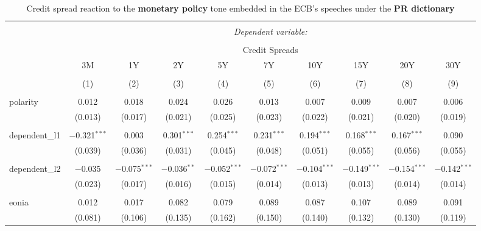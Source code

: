 
\begin{table}[!htbp] \centering 
  \caption[PR Monetary Policy Tone \& Credit Spread: all speeches]{Credit spread reaction to the \textbf{monetary policy} tone embedded in the ECB's speeches under the \textbf{PR dictionary}} 
  \label{tab:spreads_all_pr_mp} 
  \begin{adjustbox}{width=1.25\textwidth}
\begin{tabular}{@{\extracolsep{5pt}}lccccccccc} 
\\[-1.8ex]\hline 
\hline \\[-1.8ex] 
 & \multicolumn{9}{c}{\textit{Dependent variable:}} \\ 
\cline{2-10} 
\\[-1.8ex] & \multicolumn{9}{c}{Credit Spreads} \\ 
 & 3M & 1Y & 2Y & 5Y & 7Y & 10Y & 15Y & 20Y & 30Y \\ 
\\[-1.8ex] & (1) & (2) & (3) & (4) & (5) & (6) & (7) & (8) & (9)\\ 
\hline \\[-1.8ex] 
 polarity & 0.012 & 0.018 & 0.024 & 0.026 & 0.013 & 0.007 & 0.009 & 0.007 & 0.006 \\ 
  & (0.013) & (0.017) & (0.021) & (0.025) & (0.023) & (0.022) & (0.021) & (0.020) & (0.019) \\ 
  & & & & & & & & & \\ 
 dependent\_l1 & $-$0.321$^{***}$ & 0.003 & 0.301$^{***}$ & 0.254$^{***}$ & 0.231$^{***}$ & 0.194$^{***}$ & 0.168$^{***}$ & 0.167$^{***}$ & 0.090 \\ 
  & (0.039) & (0.036) & (0.031) & (0.045) & (0.048) & (0.051) & (0.055) & (0.056) & (0.055) \\ 
  & & & & & & & & & \\ 
 dependent\_l2 & $-$0.035 & $-$0.075$^{***}$ & $-$0.036$^{**}$ & $-$0.052$^{***}$ & $-$0.072$^{***}$ & $-$0.104$^{***}$ & $-$0.149$^{***}$ & $-$0.154$^{***}$ & $-$0.142$^{***}$ \\ 
  & (0.023) & (0.017) & (0.016) & (0.015) & (0.014) & (0.013) & (0.013) & (0.014) & (0.014) \\ 
  & & & & & & & & & \\ 
 eonia & 0.012 & 0.017 & 0.082 & 0.079 & 0.089 & 0.087 & 0.107 & 0.089 & 0.091 \\ 
  & (0.081) & (0.106) & (0.135) & (0.162) & (0.150) & (0.140) & (0.132) & (0.130) & (0.119) \\ 

\end{tabular}
\end{adjustbox}
\end{table}
